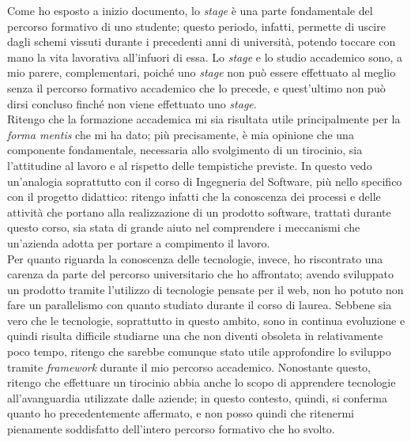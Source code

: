 Come ho esposto a inizio documento, lo \textit{stage} è una parte fondamentale del percorso formativo di uno studente; questo periodo, infatti, permette di uscire dagli schemi vissuti durante i precedenti anni di università, potendo toccare con mano la vita lavorativa all'infuori di essa. Lo \textit{stage} e lo studio accademico sono, a mio parere, complementari, poiché uno \textit{stage} non può essere effettuato al meglio senza il percorso formativo accademico che lo precede, e quest'ultimo non può dirsi concluso finché non viene effettuato uno \textit{stage}. \\
Ritengo che la formazione accademica mi sia risultata utile principalmente per la \textit{forma mentis} che mi ha dato; più precisamente, è mia opinione che una componente fondamentale, necessaria allo svolgimento di un tirocinio, sia l'attitudine al lavoro e al rispetto delle tempistiche previste. In questo vedo un'analogia soprattutto con il corso di Ingegneria del Software, più nello specifico con il progetto didattico: ritengo infatti che la conoscenza dei processi e delle attività che portano alla realizzazione di un prodotto software, trattati durante questo corso, sia stata di grande aiuto nel comprendere i meccanismi che un'azienda adotta per portare a compimento il lavoro. \\
Per quanto riguarda la conoscenza delle tecnologie, invece, ho riscontrato una carenza da parte del percorso universitario che ho affrontato; avendo sviluppato un prodotto tramite l'utilizzo di tecnologie pensate per il web, non ho potuto non fare un parallelismo con quanto studiato durante il corso di laurea. Sebbene sia vero che le tecnologie, soprattutto in questo ambito, sono in continua evoluzione e quindi risulta difficile studiarne una che non diventi obsoleta in relativamente poco tempo, ritengo che sarebbe comunque stato utile approfondire lo sviluppo tramite \textit{framework} durante il mio percorso accademico. Nonostante questo, ritengo che effettuare un tirocinio abbia anche lo scopo di apprendere tecnologie all'avanguardia utilizzate dalle aziende; in questo contesto, quindi, si conferma quanto ho precedentemente affermato, e non posso quindi che ritenermi pienamente soddisfatto dell'intero percorso formativo che ho svolto.


